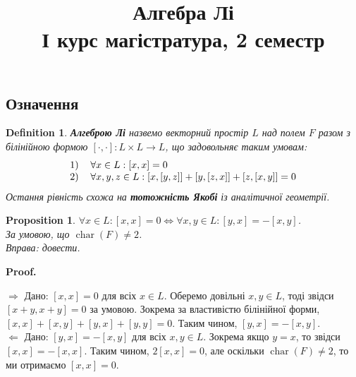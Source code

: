 \documentclass[a4paper, 10pt]{article}
\title{Алгебра Лі \\ І курс магістратура, 2 семестр}
\makeatletter
\def\rightproof{$\boxed{\Rightarrow}$ }
\def\leftproof{$\boxed{\Leftarrow}$ }
\theoremstyle{theoremdd}
\newtheorem{definition}[theorem]{Definition}
\newtheorem{proposition}[theorem]{Proposition}
\DeclareMathOperator{\charac}{char}
\renewenvironment{proof}[1][Proof.\\]{\par
\pushQED{\hfill \qed}%
\normalfont \topsep6\p@\@plus6\p@\relax
\trivlist
\item\relax
{\bfseries
#1\@addpunct{.}}\hspace\labelsep\ignorespaces
}{%
\popQED\endtrivlist\@endpefalse
}
\makeatother
\begin{document}
\maketitle
\newpage
\subsection{Означення}
\begin{definition}
\textbf{Алгеброю Лі} назвемо векторний простір $L$ над полем $F$ разом з білінійною формою $[\cdot,\cdot] \colon L \times L \to L$, що задовольняє таким умовам:
\begin{align*}
\begin{tabular}{ll}
1) & $\forall x \in L: [x,x] = 0$ \\
2) & $\forall x,y,z \in L: [x,[y,z]] + [y,[z,x]] + [z,[x,y]] = 0$
\end{tabular}
\end{align*}
Остання рівність схожа на \textbf{тотожність Якобі} із аналітичної геометрії.
\end{definition}

\begin{proposition}
$\forall x \in L: [x,x] = 0 \iff \forall x,y \in L: [y,x] = -[x,y]$.\\
За умовою, що $\charac(F) \neq 2$.\\
\textit{Вправа: довести.}
\end{proposition}

\begin{proof}
\rightproof Дано: $[x,x] = 0$ для всіх $x \in L$. Оберемо довільні $x,y \in L$, тоді звідси $[x+y,x+y] = 0$ за умовою. Зокрема за властивістю білінійної форми, $[x,x] + [x,y] + [y,x] + [y,y] = 0$. Таким чином, $[y,x] = -[x,y]$.
\bigskip \\
\leftproof Дано: $[y,x] = -[x,y]$ для всіх $x,y \in L$. Зокрема якщо $y = x$, то звідси $[x,x] = -[x,x]$. Таким чином, $2[x,x] = 0$, але оскільки $\charac(F) \neq 2$, то ми отримаємо $[x,x] = 0$.
\end{proof}
\end{document}
